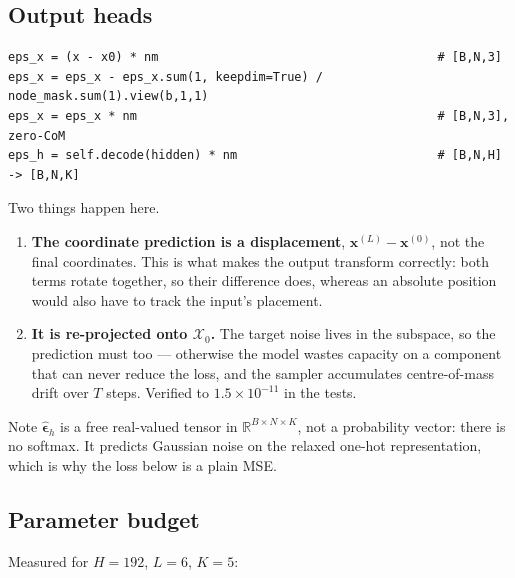 \documentclass[11pt,a4paper]{article}
\newcommand{\R}{\mathbb{R}}
\newcommand{\bx}{\mathbf{x}}
\newcommand{\bm}{\boldsymbol{\epsilon}}
\begin{document}
\subsection{Output heads}

\begin{lstlisting}[caption={From the last layer to $(\hat{\bm}_x,\hat{\bm}_h)$}]
eps_x = (x - x0) * nm                                       # [B,N,3]
eps_x = eps_x - eps_x.sum(1, keepdim=True) / node_mask.sum(1).view(b,1,1)
eps_x = eps_x * nm                                          # [B,N,3], zero-CoM
eps_h = self.decode(hidden) * nm                            # [B,N,H] -> [B,N,K]
\end{lstlisting}

\noindent
Two things happen here.
\begin{enumerate}[leftmargin=1.6em]
\item \textbf{The coordinate prediction is a displacement}, $\bx^{(L)}-\bx^{(0)}$,
      not the final coordinates. This is what makes the output transform
      correctly: both terms rotate together, so their difference does, whereas an
      absolute position would also have to track the input's placement.
\item \textbf{It is re-projected onto $\mathcal{X}_0$.} The target noise lives in
      the subspace, so the prediction must too --- otherwise the model wastes
      capacity on a component that can never reduce the loss, and the sampler
      accumulates centre-of-mass drift over $T$ steps. Verified to
      $1.5\times10^{-11}$ in the tests.
\end{enumerate}

\noindent
Note $\hat{\bm}_h$ is a free real-valued tensor in $\R^{B\times N\times K}$, not
a probability vector: there is no softmax. It predicts Gaussian noise on the
relaxed one-hot representation, which is why the loss below is a plain MSE.

\subsection{Parameter budget}

Measured for $H=192$, $L=6$, $K=5$:
\end{document}
